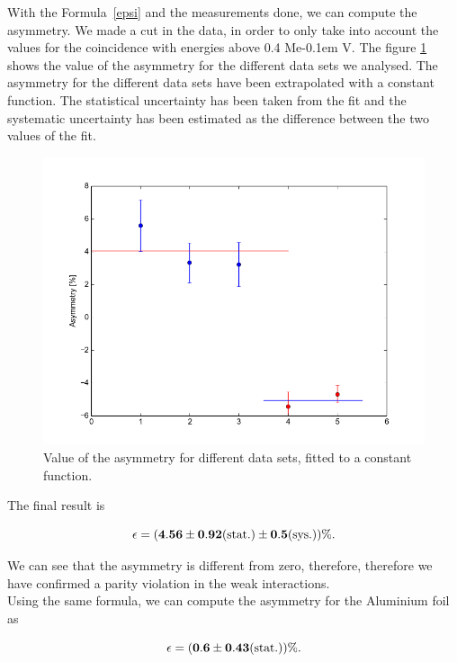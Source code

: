 \documentclass[10pt,swedish, openany]{book}
\def\MeV{\ifmmode {\mathrm{\ Me\kern -0.1em V}}\else
                   \textrm{Me\kern -0.1em V}\fi}%
\begin{document}
With the Formula~\ref{epsi} and the measurements done, we can compute the asymmetry. We made a cut in the data, in order to only take into account the values for the coincidence with energies above 0.4 \MeV. The figure \ref{fig:asymfit} shows the value of the asymmetry for the different data sets we analysed. The asymmetry for the different data sets have been extrapolated with a constant function. The statistical uncertainty has been taken from the fit and the systematic uncertainty has been estimated as the difference between the two values of the fit. 

\begin{figure}[H]
\includegraphics[scale=0.25]{epsilon.png}
\centering
\caption{Value of the asymmetry for different data sets, fitted to a constant function.}
\label{fig:asymfit}
\end{figure}

The final result is 

\begin{equation*}
    \mathbf{\epsilon = (4.56 \pm 0.92 ({\rm stat.}) \pm 0.5 ({\rm sys.}))\%}.
\end{equation*}

We can see that the asymmetry is different from zero, therefore, therefore we have confirmed a parity violation in the weak interactions.\\

Using the same formula, we can compute the asymmetry for the Aluminium foil as

\begin{equation*}
    \mathbf{\epsilon = (0.6 \pm 0.43 ({\rm stat.}))\%}.
\end{equation*}
\end{document}
